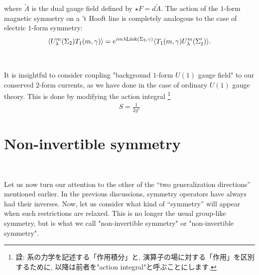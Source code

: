 \documentclass{ltjsarticle}
\theoremstyle{mystyle} %
\numberwithin{equation}{section}
\begin{document}
 where $\tilde{A}$ is the dual gauge field defined by $\star F=d\tilde{A}$. 
 The action of the $1$-form magnetic symmetry on a 't Hooft line is completely analogous to the case of electric $1$-form symmetry: 
 \begin{align}
    \langle{U^{m}_\lambda(\Sigma_2)T_1(m, \gamma)}\rangle
    =e^{im\lambda\mathrm{Link}(\Sigma_2, \gamma)}\langle{T_1(m, \gamma)U^{m}_\lambda (\Sigma'_2)}\rangle. 
 \label{ActionTotHooft}
 \end{align}
\\ \\
It is insightful to consider coupling "background $1$-form $U(1)$ gauge field" to our conserved $2$-form currents, as we have done in the case of ordinary $U(1)$ gauge theory. 
This is done by modifying the action integral
\footnote{詮: 系の力学を記述する「作用積分」と, 演算子の場に対する「作用」を区別するために, 以降は前者を"action integral"と呼ぶことにします. }
\begin{align}
    S=\frac{1}{2g^2}
\label{Gauging1formSym}
\end{align}
\subsection{}
\section{Non-invertible symmetry}
　

Let us now turn our attention to the other of the “two generalization directions” mentioned earlier. 
In the previous discussions, symmetry operators have always had their inverses. 
Now, let us consider what kind of “symmetry” will appear when such restrictions are relaxed. 
This is no longer the usual group-like symmetry, but is what we call "non-invertible symmetry" or "non-invertible symmetry". \\
\end{document}
